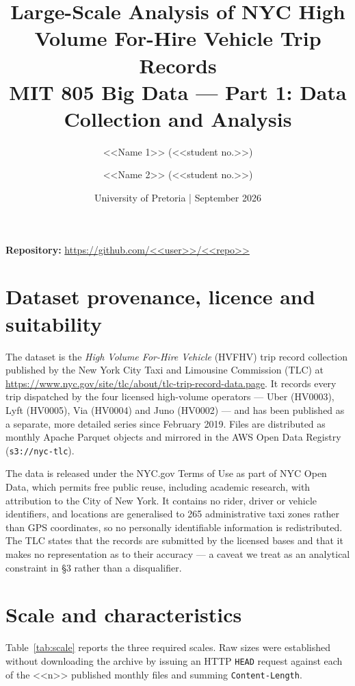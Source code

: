 \documentclass[10pt,a4paper]{article}
\title{\vspace{-2.2em}\textbf{Large-Scale Analysis of NYC High Volume For-Hire
Vehicle Trip Records}\\[0.3em]
\large MIT 805 Big Data --- Part 1: Data Collection and Analysis}
\author{<<Name 1>> (<<student no.>>) \and <<Name 2>> (<<student no.>>)}
\date{\vspace{-1em}\small University of Pretoria \quad|\quad 3 September 2026}
\begin{document}
\maketitle
\vspace{-1.8em}

\noindent\textbf{Repository:} \url{https://github.com/<<user>>/<<repo>>}

\section{Dataset provenance, licence and suitability}

The dataset is the \emph{High Volume For-Hire Vehicle} (HVFHV) trip record
collection published by the New York City Taxi and Limousine Commission (TLC)
at \url{https://www.nyc.gov/site/tlc/about/tlc-trip-record-data.page}. It
records every trip dispatched by the four licensed high-volume operators ---
Uber (HV0003), Lyft (HV0005), Via (HV0004) and Juno (HV0002) --- and has been
published as a separate, more detailed series since February 2019. Files are
distributed as monthly Apache Parquet objects and mirrored in the AWS Open Data
Registry (\texttt{s3://nyc-tlc}).

The data is released under the NYC.gov Terms of Use as part of NYC Open Data,
which permits free public reuse, including academic research, with attribution
to the City of New York. It contains no rider, driver or vehicle identifiers,
and locations are generalised to 265 administrative taxi zones rather than GPS
coordinates, so no personally identifiable information is redistributed. The
TLC states that the records are submitted by the licensed bases and that it
makes no representation as to their accuracy --- a caveat we treat as an
analytical constraint in \S3 rather than a disqualifier.

\section{Scale and characteristics}

Table~\ref{tab:scale} reports the three required scales. Raw sizes were
established without downloading the archive by issuing an HTTP \texttt{HEAD}
request against each of the <<n>> published monthly files and summing
\texttt{Content-Length}.
\end{document}
